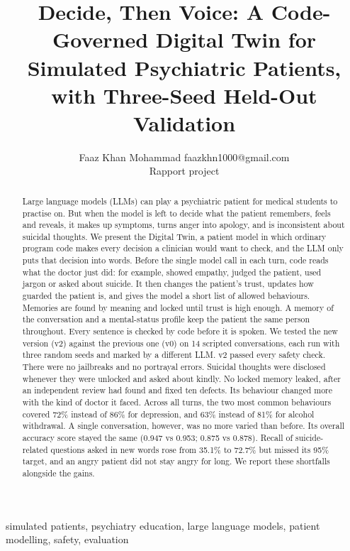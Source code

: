 \documentclass[twoside,11pt]{article}
\begin{document}
\title{Decide, Then Voice: A Code-Governed Digital Twin for Simulated Psychiatric Patients, with Three-Seed Held-Out Validation}
\author{\name Faaz Khan Mohammad \email faazkhn1000@gmail.com \\ \addr Rapport project}
\editor{}
\submitted{}{}{}
\maketitle
\begin{abstract}%
Large language models (LLMs) can play a psychiatric patient for medical students to practise on. But when the model is left to
decide what the patient remembers, feels and reveals, it makes up symptoms, turns anger into apology, and is inconsistent about
suicidal thoughts. We present the Digital Twin, a patient model in which ordinary program code makes every decision a clinician would
want to check, and the LLM only puts that decision into words. Before the single model call in each turn, code reads what the doctor just did: for example, showed empathy, judged the patient, used jargon or asked about suicide. It then changes the patient's trust, updates how guarded the patient is, and gives the model a short list of allowed behaviours. Memories are found by meaning and locked until trust is
high enough. A memory of the conversation and a mental-status profile keep the patient the same person throughout. Every sentence is
checked by code before it is spoken. We tested the new version (v2) against the previous one (v0) on 14 scripted conversations, each run
with three random seeds and marked by a different LLM. v2 passed every safety check. There were no jailbreaks and no portrayal errors. Suicidal thoughts were disclosed whenever they were unlocked and asked about kindly. No locked memory leaked, after an independent review had found and fixed ten defects.
Its behaviour changed more with the kind of doctor it faced. Across all turns, the two most common behaviours covered 72\% instead of 86\% for depression, and 63\% instead of 81\% for alcohol withdrawal. A single conversation, however, was no more varied than before. Its overall accuracy score stayed the same (0.947 vs 0.953; 0.875 vs 0.878). Recall of
suicide-related questions asked in new words rose from 35.1\% to 72.7\% but missed its 95\% target, and an angry patient did not stay angry
for long. We report these shortfalls alongside the gains.
\end{abstract}
\begin{keywords}
simulated patients, psychiatry education, large language models, patient modelling, safety, evaluation
\end{keywords}
\end{document}
